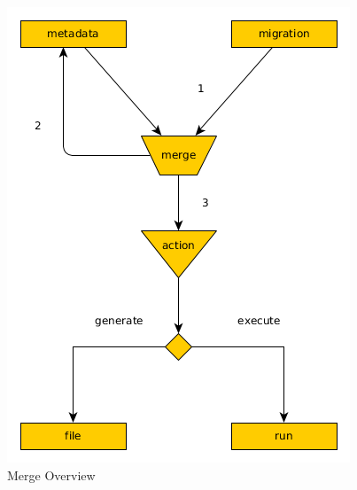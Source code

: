 \documentclass[]{article}
\begin{document}
\begin{figure}[H]
	\centering
	\includegraphics[scale=0.45]{fs2_merge_1a.png}
	\caption{Merge Overview}
\end{figure}
\end{document}
